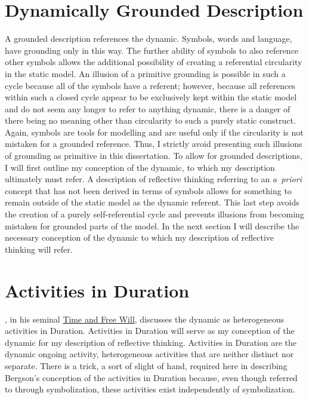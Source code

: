 \section{Dynamically Grounded Description}

A grounded description references the dynamic.  Symbols, words and
language, have grounding only in this way.  The further ability of
symbols to also reference other symbols allows the additional
possibility of creating a referential circularity in the static model.
An illusion of a primitive grounding is possible in such a cycle
because all of the symbols have a referent; however, because all
references within such a closed cycle appear to be exclusively kept
within the static model and do not seem any longer to refer to
anything dynamic, there is a danger of there being no meaning other
than circularity to such a purely static construct.  Again, symbols
are tools for modelling and are useful only if the circularity is not
mistaken for a grounded reference.  Thus, I strictly avoid presenting
such illusions of grounding as primitive in this dissertation.  To
allow for grounded descriptions, I will first outline my conception of
the dynamic, to which my description ultimately must refer.  A
description of reflective thinking referring to an \emph{a~priori}
concept that has not been derived in terms of symbols allows for
something to remain outside of the static model as the dynamic
referent.  This last step avoids the creation of a purely
self-referential cycle and prevents illusions from becoming mistaken
for grounded parts of the model.  In the next section I will describe
the necessary conception of the dynamic to which my description of
reflective thinking will refer.

\section{Activities in Duration}

\cite{bergson:1910}, in his seminal \underline{Time and Free Will},
discusses the dynamic as heterogeneous activities in Duration.
Activities in Duration will serve as my conception of the dynamic for
my description of reflective thinking.  Activities in Duration are the
dynamic ongoing activity, heterogeneous activities that are neither
distinct nor separate.  There is a trick, a sort of slight of hand,
required here in describing Bergson's conception of the activities in
Duration because, even though referred to through symbolization, these
activities exist independently of symbolization.

